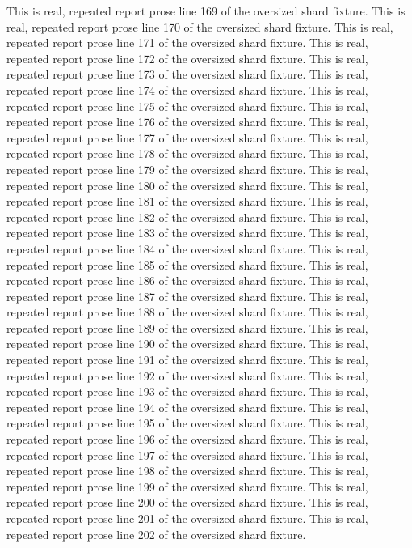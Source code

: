 This is real, repeated report prose line 169 of the oversized shard fixture.
This is real, repeated report prose line 170 of the oversized shard fixture.
This is real, repeated report prose line 171 of the oversized shard fixture.
This is real, repeated report prose line 172 of the oversized shard fixture.
This is real, repeated report prose line 173 of the oversized shard fixture.
This is real, repeated report prose line 174 of the oversized shard fixture.
This is real, repeated report prose line 175 of the oversized shard fixture.
This is real, repeated report prose line 176 of the oversized shard fixture.
This is real, repeated report prose line 177 of the oversized shard fixture.
This is real, repeated report prose line 178 of the oversized shard fixture.
This is real, repeated report prose line 179 of the oversized shard fixture.
This is real, repeated report prose line 180 of the oversized shard fixture.
This is real, repeated report prose line 181 of the oversized shard fixture.
This is real, repeated report prose line 182 of the oversized shard fixture.
This is real, repeated report prose line 183 of the oversized shard fixture.
This is real, repeated report prose line 184 of the oversized shard fixture.
This is real, repeated report prose line 185 of the oversized shard fixture.
This is real, repeated report prose line 186 of the oversized shard fixture.
This is real, repeated report prose line 187 of the oversized shard fixture.
This is real, repeated report prose line 188 of the oversized shard fixture.
This is real, repeated report prose line 189 of the oversized shard fixture.
This is real, repeated report prose line 190 of the oversized shard fixture.
This is real, repeated report prose line 191 of the oversized shard fixture.
This is real, repeated report prose line 192 of the oversized shard fixture.
This is real, repeated report prose line 193 of the oversized shard fixture.
This is real, repeated report prose line 194 of the oversized shard fixture.
This is real, repeated report prose line 195 of the oversized shard fixture.
This is real, repeated report prose line 196 of the oversized shard fixture.
This is real, repeated report prose line 197 of the oversized shard fixture.
This is real, repeated report prose line 198 of the oversized shard fixture.
This is real, repeated report prose line 199 of the oversized shard fixture.
This is real, repeated report prose line 200 of the oversized shard fixture.
This is real, repeated report prose line 201 of the oversized shard fixture.
This is real, repeated report prose line 202 of the oversized shard fixture.
